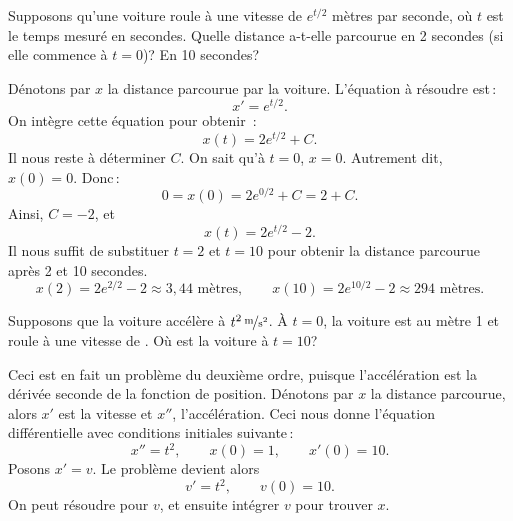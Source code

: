 \begin{example}
Supposons qu'une voiture roule à une vitesse de $e^{t/2}$ mètres par seconde, où $t$ est le temps mesuré en secondes.
Quelle distance a-t-elle parcourue en 2 secondes (si elle commence à $t=0$)?  En 10 secondes?

Dénotons par $x$ la distance parcourue par la voiture.
L'équation à résoudre est\,: 
\begin{equation*}
	x' = e^{t/2} .
\end{equation*}
On intègre cette équation pour obtenir \,:
\begin{equation*}
	x(t) = 2 e^{t/2} + C . 
\end{equation*}
Il nous reste à déterminer $C$.  On sait qu'à $t=0$,
$x=0$.  Autrement dit, $x(0) = 0$.  Donc\,: 
\begin{equation*}
	0 = x(0) = 2e^{0/2} + C = 2 + C .
\end{equation*}
Ainsi, $C = -2$, et
\begin{equation*}
	x(t) = 2 e^{t/2} - 2 .
\end{equation*}
Il nous suffit de substituer $t=2$ et $t=10$ pour obtenir la distance parcourue après 2 et 10 secondes.
\begin{equation*}
	x(2) = 2e^{2/2} - 2 \approx 3,44 \text{ mètres} ,
	\qquad
	x(10) = 2e^{10/2} - 2 \approx 294 \text{ mètres} .
\end{equation*}
\end{example}

\begin{example}
Supposons que la voiture accélère à $\unitfrac[t^2]{m}{s^2}$.
À $t=0$, la voiture est au mètre 1 et roule à une vitesse de 
.  Où est la voiture à $t=10$?

Ceci est en fait un problème du deuxième ordre, puisque l'accélération est la dérivée seconde de la fonction de position.  Dénotons par $x$ la distance parcourue, alors $x'$ est la vitesse et $x''$, l'accélération.
Ceci nous donne l'équation différentielle avec conditions initiales suivante\,:
\begin{equation*}
	x'' = t^2 , \qquad x(0) = 1 , \qquad x'(0) = 10 .
\end{equation*}
Posons $x' = v$.  Le problème devient alors
\begin{equation*}
	v' = t^2, \qquad v(0) = 10 .
\end{equation*}
On peut résoudre pour $v$, et ensuite intégrer $v$ pour trouver $x$.
\end{example}

